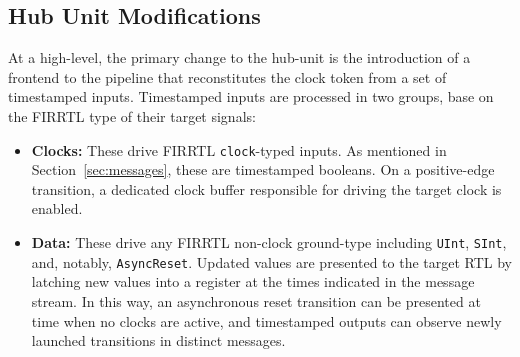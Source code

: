 \subsection{Hub Unit Modifications}\label{sec:pdes-hub-modifications}

At a high-level, the primary change to the hub-unit is the introduction of a
frontend to the pipeline that reconstitutes the clock token from a set of
timestamped inputs. Timestamped inputs are processed in two groups, base on the FIRRTL type of their target signals:

\begin{itemize}

\item \textbf{Clocks:} These drive FIRRTL \texttt{clock}-typed inputs. As mentioned in Section~\ref{sec:messages},
these are timestamped booleans. On a positive-edge transition, a dedicated clock buffer
responsible for driving the target clock is enabled.

\item \textbf{Data:} These drive any FIRRTL non-clock ground-type including
    \texttt{UInt}, \texttt{SInt}, and, notably, \texttt{AsyncReset}. Updated
        values are presented to the target RTL by latching new values into a
        register at the times indicated in the message stream. In this way, an
        asynchronous reset transition can be presented at time when no clocks
        are active, and timestamped outputs can observe newly launched transitions in distinct messages.
\end{itemize}

